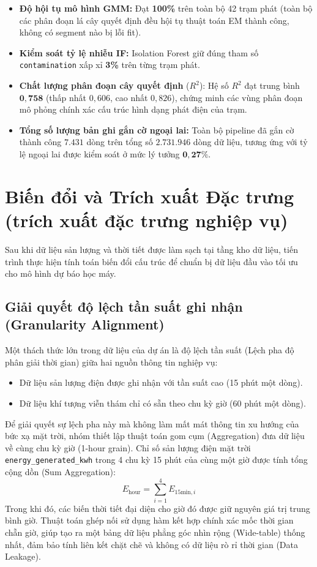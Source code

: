 \documentclass[12pt, a4paper]{report}
\begin{document}
\begin{itemize}
    \item \textbf{Độ hội tụ mô hình GMM:} Đạt \textbf{100\%} trên toàn bộ 42 trạm phát (toàn bộ các phân đoạn lá cây quyết định đều hội tụ thuật toán EM thành công, không có segment nào bị lỗi fit).
    \item \textbf{Kiểm soát tỷ lệ nhiễu IF:} Isolation Forest giữ đúng tham số \texttt{contamination} xấp xỉ \textbf{3\%} trên từng trạm phát.
    \item \textbf{Chất lượng phân đoạn cây quyết định} ($R^2$): Hệ số $R^2$ đạt trung bình $\mathbf{0{,}758}$ (thấp nhất $0{,}606$, cao nhất $0{,}826$), chứng minh các vùng phân đoạn mô phỏng chính xác cấu trúc hình dạng phát điện của trạm.
    \item \textbf{Tổng số lượng bản ghi gắn cờ ngoại lai:} Toàn bộ pipeline đã gắn cờ thành công $\mathbf{7.431}$ dòng trên tổng số $\mathbf{2.731.946}$ dòng dữ liệu, tương ứng với tỷ lệ ngoại lai được kiểm soát ở mức lý tưởng $\mathbf{0{,}27\%}$.
\end{itemize}

\section{Biến đổi và Trích xuất Đặc trưng (trích xuất đặc trưng nghiệp vụ)}
\label{sec:transformation}

Sau khi dữ liệu sản lượng và thời tiết được làm sạch tại tầng kho dữ liệu, tiến trình thực hiện tính toán biến đổi cấu trúc để chuẩn bị dữ liệu đầu vào tối ưu cho mô hình dự báo học máy.

\subsection{Giải quyết độ lệch tần suất ghi nhận (Granularity Alignment)}
Một thách thức lớn trong dữ liệu của dự án là độ lệch tần suất (Lệch pha độ phân giải thời gian) giữa hai nguồn thông tin nghiệp vụ:
\begin{itemize}
    \item Dữ liệu sản lượng điện được ghi nhận với tần suất cao (15 phút một dòng).
    \item Dữ liệu khí tượng viễn thám chỉ có sẵn theo chu kỳ giờ (60 phút một dòng).
\end{itemize}

Để giải quyết sự lệch pha này mà không làm mất mát thông tin xu hướng của bức xạ mặt trời, nhóm thiết lập thuật toán gom cụm (Aggregation) đưa dữ liệu về cùng chu kỳ giờ (1-hour grain). Chỉ số sản lượng điện mặt trời \texttt{energy\_generated\_kwh} trong 4 chu kỳ 15 phút của cùng một giờ được tính tổng cộng dồn (Sum Aggregation):
\begin{equation}
E_{\text{hour}} = \sum_{i=1}^{4} E_{15\text{min}, i}
\end{equation}
Trong khi đó, các biến thời tiết đại diện cho giờ đó được giữ nguyên giá trị trung bình giờ. Thuật toán ghép nối sử dụng hàm kết hợp chính xác mốc thời gian chẵn giờ, giúp tạo ra một bảng dữ liệu phẳng góc nhìn rộng (Wide-table) thống nhất, đảm bảo tính liên kết chặt chẽ và không có dữ liệu rò rỉ thời gian (Data Leakage).
\end{document}
